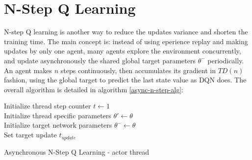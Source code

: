 \documentclass[10pt,a4paper,draft]{article}
\begin{document}
\section{N-Step Q Learning}
N-step Q learning \cite{nstepq2016} is another way to reduce the updates variance and shorten the training time. The main concept is: instead of using eperience replay and making updates by only one agent, many agents explore the environment concurrently, and update asynchronously the shared global target parameters $\theta^-$  periodically. An agent makes $n$ steps continuously, then accumulates its gradient in $TD(n)$ fashion, using the global target to predict the last state value as DQN does. The overall algorithm is detailed in algorithm \ref{async-n-step-alg}:

\begin{algorithm}[H]
	\SetAlgoLined
	\DontPrintSemicolon
	\KwResult{$\theta$}
	Initialize thread step counter $t \leftarrow 1$ \\
	Initialize thread specific parameters  $\theta' \leftarrow \theta$ \\ 
	Initialize target network parameters  $\theta^- \leftarrow \theta$ \\ 
	Set target update $t_{update}$ \\ 
	\caption{Asynchronous N-Step Q Learning - actor thread}
 	\label{async-n-step-alg}
\end{algorithm}
\end{document}
